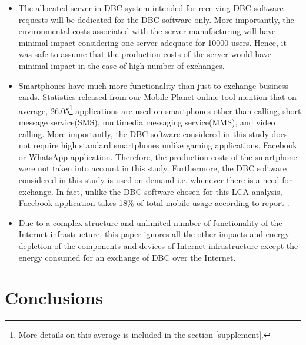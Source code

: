 \documentclass[conference]{IEEEtran}
\begin{document}
\begin{itemize}
\item The allocated server in DBC system intended for receiving DBC software requests will be dedicated for the DBC software only. More importantly, the environmental costs associated with the server manufacturing will have minimal impact considering one server adequate for 10000 users. Hence, it was safe to assume that the production costs of the server would have minimal impact in the case of high number of exchanges.
\item Smartphones have much more functionality than just to exchange business cards. Statistics released from our Mobile Planet online tool mention that on average, 26.05\footnote{More details on this average is included in the section \ref{supplement}.} applications are used on smartphones other than calling, short message service(SMS), multimedia messaging service(MMS), and video calling. More importantly, the DBC software considered in this study does not require high standard smartphones unlike gaming applications, Facebook or WhatsApp application. Therefore,  the production costs of the smartphone were not taken into account in this study. Furthermore, the DBC software considered in this study is used on demand i.e. whenever there is a need for exchange. In fact, unlike the DBC software chosen for this LCA analysis, Facebook application takes 18\% of total mobile usage according to report \cite{Flurry}.

\item Due to a complex structure and unlimited number of functionality of the Internet infrastructure, this paper ignores all the other impacts and energy depletion of the components and devices of Internet infrastructure except the energy consumed for an exchange of DBC over the Internet.

\end{itemize}

\section{Conclusions}
\end{document}
